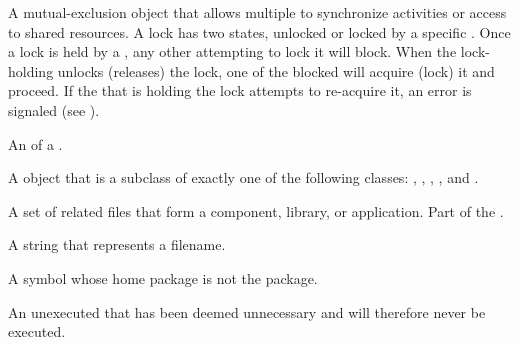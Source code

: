 \begin{glossary-list}

\glent[lock] 
%
%
%
%
A mutual-exclusion object that allows multiple  to
synchronize activities or access to shared resources. A lock has two
states, unlocked or locked by a specific . Once a lock
is held by a , any other  attempting to
lock it will block. When the lock-holding  unlocks
(releases) the lock, one of the blocked  will acquire
(lock) it and proceed.  If the  that is holding the lock
attempts to re-acquire it, an error is signaled (see
).


\glent[metaobject]
%
%
An  of a .


%
%
%
A  object that is a subclass of exactly one of the following
classes: , , ,
, and .


\glent[module]
%
%
%
A set of related files that form a component, library, or application.
Part of the .


\glent[namestring]
%
%
A string that represents a filename.


%
%
%
A symbol whose home package is not the  package.


%
%
%
%
%
%
%
%
An unexecuted  that has been deemed unnecessary and will
therefore never be executed.


\end{glossary-list}
